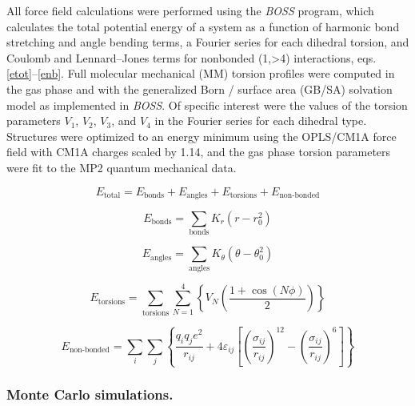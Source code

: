 \documentclass[12pt]{report}
\begin{document}
All force field calculations were performed using the \textit{BOSS} program,\cite{jorg2005} which calculates the total potential energy of a system as a function of harmonic bond stretching and angle bending terms, a Fourier series for each dihedral torsion, and Coulomb and Lennard--Jones terms for nonbonded (1,>4) interactions, eqs. \ref{etot}--\ref{enb}. Full molecular mechanical (MM) torsion profiles were computed in the gas phase and with the generalized Born / surface area (GB/SA) solvation model as implemented in \textit{BOSS}\@. Of specific interest were the values of the torsion parameters $V_1$, $V_2$, $V_3$, and $V_4$ in the Fourier series for each dihedral type. Structures were optimized to an energy minimum using the OPLS/CM1A force field with CM1A charges scaled by 1.14, and the gas phase torsion parameters were fit to the MP2 quantum mechanical data.

\begin{equation}
\label{etot}
E_{\textrm{total}} = E_{\textrm{bonds}} + E_{\textrm{angles}} + E_{\textrm{torsions}} + E_{\textrm{non-bonded}}
\end{equation}

\vspace*{-0.45cm}
\begin{equation}
\label{ebonds}
E_{\textrm{bonds}} = \sum_{\textrm{bonds}} K_r (r - r_0^2)
\end{equation}

\vspace*{-0.2cm}
\begin{equation}
\label{eangs}
E_{\textrm{angles}} = \sum_{\textrm{angles}} K_\theta (\theta - \theta_0^2)
\end{equation}

\begin{equation}
\label{edih}
E_{\textrm{torsions}} = \sum_{\textrm{torsions}} \sum_{N=1}^4 \left\{ V_{N} \left( \frac{1+\cos(N\phi)}{2} \right) \right\}
\end{equation}

\begin{equation}
\label{enb}
E_{\textrm{non-bonded}} = \sum_i \sum_j \left\{ \frac{q_i q_j e^2}{r_{ij}} + 4\varepsilon_{ij}\left[\left(\frac{\sigma_{ij}}{r_{ij}}\right)^{12}-\left(\frac{\sigma_{ij}}{r_{ij}}\right)^{6}\right] \right\}
\end{equation}
\vspace*{-0.4cm}

\subsubsection{Monte Carlo simulations.}
\end{document}

